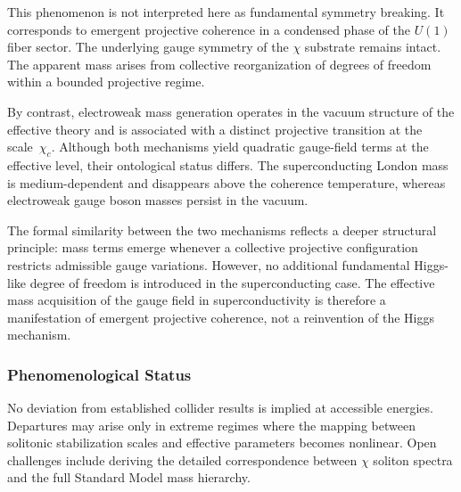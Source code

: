     This phenomenon is not interpreted here as fundamental symmetry breaking.
    It corresponds to emergent projective coherence in a condensed phase
    of the $U(1)$ fiber sector.
    The underlying gauge symmetry of the $\chi$ substrate remains intact.
    The apparent mass arises from collective reorganization of degrees
    of freedom within a bounded projective regime.

    By contrast, electroweak mass generation operates in the vacuum
    structure of the effective theory and is associated with a distinct
    projective transition at the scale~$\chi_c$.
    Although both mechanisms yield quadratic gauge-field terms at the
    effective level, their ontological status differs.
    The superconducting London mass is medium-dependent and
    disappears above the coherence temperature,
    whereas electroweak gauge boson masses persist in the vacuum.

    The formal similarity between the two mechanisms reflects a deeper
    structural principle:
    mass terms emerge whenever a collective projective configuration
    restricts admissible gauge variations.
    However, no additional fundamental Higgs-like degree of freedom
    is introduced in the superconducting case.
    The effective mass acquisition of the gauge field in
    superconductivity is therefore a manifestation of emergent
    projective coherence, not a reinvention of the Higgs mechanism.

  \subsubsection*{Phenomenological Status}
    \label{subsec:phenomenological-implications}
    \label{subsec:higgs-summary}

    No deviation from established collider results is implied at accessible
    energies.
    Departures may arise only in extreme regimes where the mapping between
    solitonic stabilization scales and effective parameters becomes nonlinear.
    Open challenges include deriving the detailed correspondence between
    $\chi$ soliton spectra and the full Standard Model mass hierarchy.
